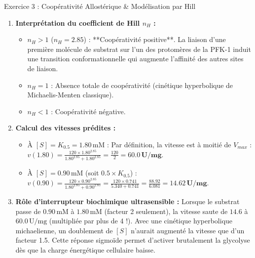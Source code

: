 \documentclass[11pt,a4paper]{article}
\begin{document}
\begin{solutionbox}{Exercice 3 : Coopérativité Allostérique \& Modélisation par Hill}
\begin{enumerate}[label=\textbf{\alph*.}]
  \item \textbf{Interprétation du coefficient de Hill $n_H$ :}
  \begin{itemize}
    \item $n_H > 1$ ($n_H = 2.85$) : **Coopérativité positive**. La liaison d'une première molécule de substrat sur l'un des protomères de la PFK-1 induit une transition conformationnelle qui augmente l'affinité des autres sites de liaison.
    \item $n_H = 1$ : Absence totale de coopérativité (cinétique hyperbolique de Michaelis-Menten classique).
    \item $n_H < 1$ : Coopérativité négative.
  \end{itemize}

  \item \textbf{Calcul des vitesses prédites :}
  \begin{itemize}
    \item À $[S] = K_{0.5} = 1.80\,\text{mM}$ : Par définition, la vitesse est à moitié de $V_{max}$ :
    $v(1.80) = \frac{120 \times 1.80^{2.85}}{1.80^{2.85} + 1.80^{2.85}} = \frac{120}{2} = \mathbf{60.0\,\text{U/mg}}$.
    \item À $[S] = 0.90\,\text{mM}$ (soit $0.5 \times K_{0.5}$) :
    $v(0.90) = \frac{120 \times 0.90^{2.85}}{1.80^{2.85} + 0.90^{2.85}} = \frac{120 \times 0.741}{5.340 + 0.741} = \frac{88.92}{6.081} = \mathbf{14.62\,\text{U/mg}}$.
  \end{itemize}

  \item \textbf{Rôle d'interrupteur biochimique ultrasensible :}
  Lorsque le substrat passe de $0.90\,\text{mM}$ à $1.80\,\text{mM}$ (facteur 2 seulement), la vitesse saute de $14.6$ à $60.0\,\text{U/mg}$ (multipliée par plus de 4 !). Avec une cinétique hyperbolique michaelienne, un doublement de $[S]$ n'aurait augmenté la vitesse que d'un facteur 1.5. Cette réponse sigmoïde permet d'activer brutalement la glycolyse dès que la charge énergétique cellulaire baisse.
\end{enumerate}
\end{solutionbox}
\end{document}
